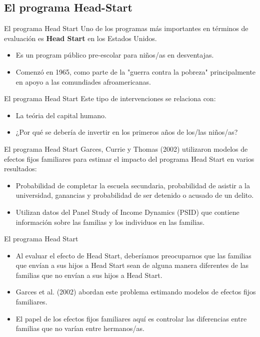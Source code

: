 \documentclass[11pt, aspectratio=169, compress]{beamer}
\begin{document}
\subsection{El programa Head-Start}
\begin{frame}[t]{El programa Head Start}
	Uno de los programas más importantes en términos de evaluación es \textbf{Head Start} en los Estados Unidos. 
\begin{itemize}
	\item Es un program público pre-escolar para niños/as en desventajas. 
	\item Comenzó en 1965, como parte de la "guerra contra la pobreza" principalmente en apoyo a las comundiades afroamericanas. 
\end{itemize}	
\end{frame}
\begin{frame}[t]{El programa Head Start}
	Este tipo de intervenciones se relaciona con: 
	\begin{itemize}
		\item La teória del capital humano. 
		\item ¿Por qué se debería de invertir en los primeros años de los/las niños/as? 
	\end{itemize}	
\end{frame}
\begin{frame}[t]{El programa Head Start}
	Garces, Currie y Thomas (2002) utilizaron modelos de efectos fijos familiares para estimar el impacto del programa Head Start en varios resultados: 
	\begin{itemize}
		\item Probabilidad de completar la escuela secundaria, probabilidad de asistir a la universidad, ganancias y probabilidad de ser detenido o acusado de un delito. 
		\item Utilizan datos del Panel Study of Income Dynamics (PSID) que contiene información sobre las familias y los individuos en las familias. 
	\end{itemize}
\end{frame}
\begin{frame}[t]{El programa Head Start}
	\begin{itemize}
		\item Al evaluar el efecto de Head Start, deberíamos preocuparnos que las familias que envían a sus hijos a Head Start sean de alguna manera diferentes de las familias que no envían a sus hijos a Head Start.
		\item Garces et al. (2002) abordan este problema estimando modelos de efectos fijos familiares. 
		\item El papel de los efectos fijos familiares aquí es controlar las diferencias entre familias que no varían entre hermanos/as.
	\end{itemize}
\end{frame}
\end{document}
